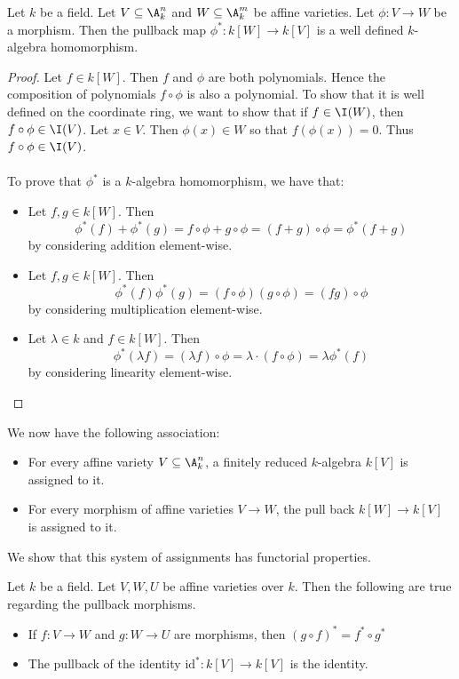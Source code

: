 \documentclass[a4paper]{article}
\begin{document}
\begin{lmm}{}{} Let $k$ be a field. Let $V\subseteq\A_k^n$ and $W\subseteq\A_k^m$ be affine varieties. Let $\phi:V\to W$ be a morphism. Then the pullback map $\phi^\ast:k[W]\to k[V]$ is a well defined $k$-algebra homomorphism. 
\begin{proof}
Let $f\in k[W]$. Then $f$ and $\phi$ are both polynomials. Hence the composition of polynomials $f\circ\phi$ is also a polynomial. To show that it is well defined on the coordinate ring, we want to show that if $f\in\I(W)$, then $f\circ\phi\in\I(V)$. Let $x\in V$. Then $\phi(x)\in W$ so that $f(\phi(x))=0$. Thus $f\circ\phi\in\I(V)$. \\~\\

To prove that $\phi^\ast$ is a $k$-algebra homomorphism, we have that: 
\begin{itemize}
\item Let $f,g\in k[W]$. Then $$\phi^\ast(f)+\phi^\ast(g)=f\circ\phi+g\circ\phi=(f+g)\circ\phi=\phi^\ast(f+g)$$ by considering addition element-wise. 
\item Let $f,g\in k[W]$. Then $$\phi^\ast(f)\phi^\ast(g)=(f\circ\phi)(g\circ\phi)=(fg)\circ\phi$$ by considering multiplication element-wise. 
\item Let $\lambda\in k$ and $f\in k[W]$. Then $$\phi^\ast(\lambda f)=(\lambda f)\circ\phi=\lambda\cdot(f\circ\phi)=\lambda\phi^\ast(f)$$ by considering linearity element-wise. 
\end{itemize}
\end{proof}
\end{lmm}

We now have the following association:
\begin{itemize}
\item For every affine variety $V\subseteq\A_k^n$, a finitely reduced $k$-algebra $k[V]$ is assigned to it. 
\item For every morphism of affine varieties $V\to W$, the pull back $k[W]\to k[V]$ is assigned to it. 
\end{itemize}
We show that this system of assignments has functorial properties. 

\begin{prp}{}{} Let $k$ be a field. Let $V,W,U$ be affine varieties over $k$. Then the following are true regarding the pullback morphisms. 
\begin{itemize}
\item If $f:V\to W$ and $g:W\to U$ are morphisms, then $(g\circ f)^\ast=f^\ast\circ g^\ast$
\item The pullback of the identity $\text{id}^\ast:k[V]\to k[V]$ is the identity. 
\end{itemize}
\end{prp}
\end{document}
